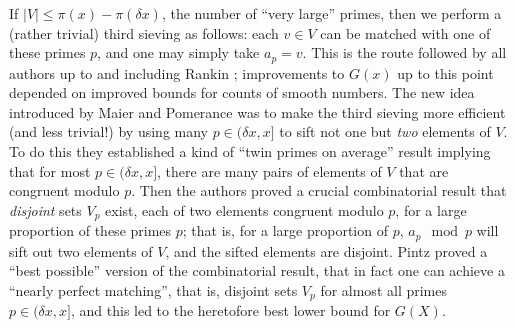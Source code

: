 \documentclass[12pt]{amsart}
\numberwithin{equation}{section}  %
\theoremstyle{remark}
\theoremstyle{plain}
\numberwithin{equation}{section}
\newcommand{\del}{\ensuremath{\delta}}
\renewcommand{\le}{\leqslant}
\renewcommand{\(}{\left(}
\renewcommand{\)}{\right)}
\begin{document}
 If $|V| \le \pi(x)-\pi(\del x)$, the number of 
``very large'' primes, then we perform a (rather trivial) third sieving as follows: each $v \in V$ can be matched with
one of these primes $p$, and one may simply take $a_p=v$. 
This is the route followed by all authors up to and including Rankin \cite{rankin-1963}; improvements 
to $G(x)$ up to this point depended on improved bounds for counts of 
smooth numbers.  
The new idea introduced by Maier and Pomerance \cite{MP} was to make
the third sieving more efficient (and less trivial!) by using many $p
\in (\del x, x]$ to sift not one but \emph{two} elements of $V$. 
To do this they established a kind of 
``twin primes on average'' result implying that for most
$p\in (\del x,x]$, there are many pairs of elements of $V$ that are
 congruent modulo $p$.  Then the authors proved a crucial combinatorial result
 that \emph{disjoint} sets $V_p$ exist, each of two elements congruent
 modulo $p$, for a large proportion of these primes $p$; that is, for
 a large proportion of $p$, $a_p\mod p$ will sift out two elements of
 $V$, and the sifted elements are disjoint.
Pintz \cite{P} proved a ``best possible'' version of the combinatorial
result, that in fact one can achieve a ``nearly perfect matching'',
that is, disjoint sets $V_p$ for almost all primes $p\in (\del x,x]$,
and this led to the heretofore best lower bound for $G(X)$.
\end{document}
